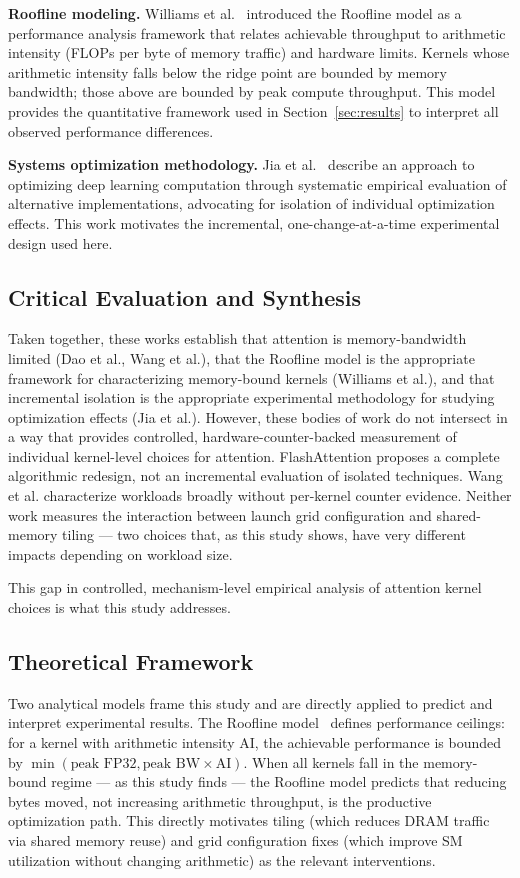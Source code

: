 \documentclass{article}
\begin{document}
\textbf{Roofline modeling.}
Williams et al.~\cite{williams2009roofline} introduced the Roofline model
as a performance analysis framework that relates achievable throughput to
arithmetic intensity (FLOPs per byte of memory traffic) and hardware limits.
Kernels whose arithmetic intensity falls below the ridge point are bounded
by memory bandwidth; those above are bounded by peak compute throughput.
This model provides the quantitative framework used in Section~\ref{sec:results}
to interpret all observed performance differences.

\textbf{Systems optimization methodology.}
Jia et al.~\cite{jia2019optimizing} describe an approach to optimizing deep
learning computation through systematic empirical evaluation of alternative
implementations, advocating for isolation of individual optimization effects.
This work motivates the incremental, one-change-at-a-time experimental
design used here.

\subsection{Critical Evaluation and Synthesis}

Taken together, these works establish that attention is memory-bandwidth
limited (Dao et al., Wang et al.), that the Roofline model is the appropriate
framework for characterizing memory-bound kernels (Williams et al.), and that
incremental isolation is the appropriate experimental methodology for studying
optimization effects (Jia et al.). However, these bodies of work do not
intersect in a way that provides controlled, hardware-counter-backed
measurement of individual kernel-level choices for attention. FlashAttention
proposes a complete algorithmic redesign, not an incremental evaluation of
isolated techniques. Wang et al. characterize workloads broadly without
per-kernel counter evidence. Neither work measures the interaction between
launch grid configuration and shared-memory tiling — two choices that, as
this study shows, have very different impacts depending on workload size.

This gap in controlled, mechanism-level empirical analysis of attention
kernel choices is what this study addresses.

\subsection{Theoretical Framework}

Two analytical models frame this study and are directly applied to predict
and interpret experimental results. The Roofline
model~\cite{williams2009roofline} defines performance ceilings: for a kernel
with arithmetic intensity AI, the achievable performance is bounded by
$\min(\text{peak FP32}, \text{peak BW} \times \text{AI})$. When all kernels
fall in the memory-bound regime — as this study finds — the Roofline model
predicts that reducing bytes moved, not increasing arithmetic throughput,
is the productive optimization path. This directly motivates tiling (which
reduces DRAM traffic via shared memory reuse) and grid configuration fixes
(which improve SM utilization without changing arithmetic) as the relevant
interventions.
\end{document}
